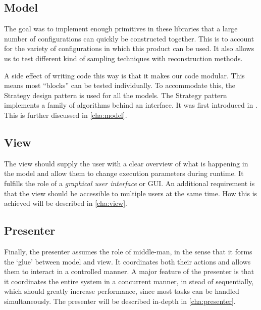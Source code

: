 \documentclass[a4paper, openany, oneside]{memoir}
\begin{document}
\subsection{Model}
\label{sub:model}
The goal was to implement enough primitives in these libraries that a large number of configurations can quickly be constructed together. This is to account for the variety of configurations in which this product can be used. It also allows us to test different kind of sampling techniques with reconstruction methods.

A side effect of writing code this way is that it makes our code modular. This means most ``blocks'' can be tested individually. To accommodate this, the Strategy design pattern is used for all the models. The Strategy pattern implements a family of algorithms behind an interface. It was first introduced in \cite{designpatterns}. This is further discussed in \cref{cha:model}.

\subsection{View}
\label{sub:view}
The view should supply the user with a clear overview of what is happening in the model and allow them to change execution parameters during runtime. It fulfills the role of a \emph{graphical user interface} or GUI. An additional requirement is that the view should be accessible to multiple users at the same time. How this is achieved will be described in \cref{cha:view}.

\subsection{Presenter}
\label{sub:presenter}
Finally, the presenter assumes the role of middle-man, in the sense that it forms the `glue' between model and view. It coordinates both their actions and allows them to interact in a controlled manner. A major feature of the presenter is that it coordinates the entire system in a concurrent manner, in stead of sequentially, which should greatly increase performance, since most tasks can be handled simultaneously. The presenter will be described in-depth in \cref{cha:presenter}.
\end{document}
